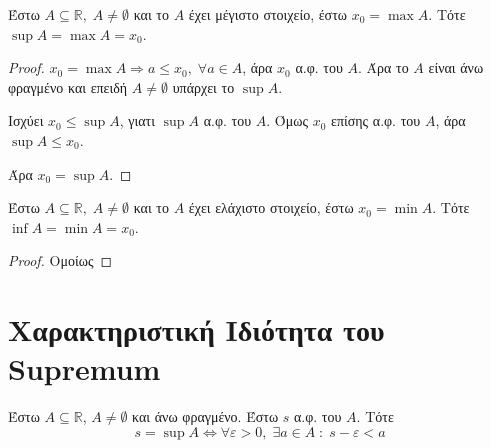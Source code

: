 \documentclass[main.tex]{subfiles}
\begin{document}
\begin{prop}
    Έστω $ A \subseteq \mathbb{R}, \; A \neq \emptyset $ και το $A$ έχει μέγιστο 
    στοιχείο, έστω $ x_{0} = \max A $. Τότε $ \sup A = \max A = x_{0}$.
\end{prop}

\begin{proof}
\item {}
    $ x_{0} = \max A \Rightarrow a \leq x_{0}, \; \forall a \in A $, άρα $ x_{0} $ α.φ. 
    του $A$. Άρα το $A$ είναι άνω φραγμένο και επειδή $ A \neq \emptyset $ υπάρχει 
    το $ \sup A $. 

    Ισχύει $ x_{0} \leq \sup A $, γιατι $ \sup A $ α.φ. του $A$.
    Όμως $ x_{0} $ επίσης α.φ. του $A$, άρα $ \sup A \leq x_{0} $.

    Άρα $ x_{0}= \sup A $.
\end{proof}

\begin{prop}
    Έστω $ A \subseteq \mathbb{R}, \; A \neq \emptyset $ και το $A$ έχει ελάχιστο
    στοιχείο, έστω $ x_{0} = \min A $. Τότε $ \inf A = \min A = x_{0}$.
\end{prop}

\begin{proof}
    Ομοίως 
\end{proof}

\section{Χαρακτηριστική Ιδιότητα του Supremum}

Έστω $ A \subseteq \mathbb{R} $, $ A \neq \emptyset $ και άνω φραγμένο. 
Έστω $ s $ α.φ. του $A$. Τότε 
\[
     s= \sup A \Leftrightarrow \forall \varepsilon >0, \; \exists a \in A \; 
     : \; s - \varepsilon < a
 \] 
\end{document}
